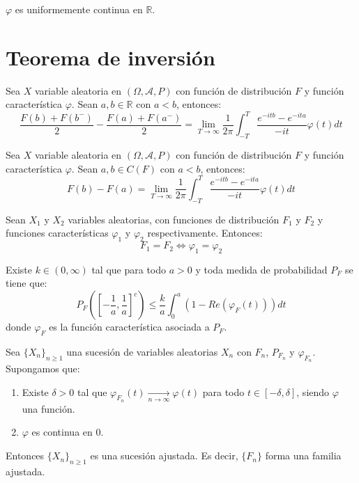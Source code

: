 \begin{theorem}
    $\varphi$ es uniformemente continua en $\mathbb{R}$.
\end{theorem}

\section{Teorema de inversión}
\begin{theorem}
    Sea $X$ variable aleatoria en $(\Omega, \mathcal{A}, P)$ con función de distribución $F$ y función característica $\varphi$.
    Sean $a, b \in \mathbb{R}$ con $a < b$, entonces:
    $$\frac{F(b)+F(b^-)}{2} - \frac{F(a)+F(a^-)}{2} = \lim\limits_{T \to \infty} \frac{1}{2\pi} \int_{-T}^T \frac{e^{-itb}-e^{-ita}}{-it} \varphi(t)dt$$
\end{theorem}

\begin{corollary}
    Sea $X$ variable aleatoria en $(\Omega, \mathcal{A}, P)$ con función de distribución $F$ y función característica $\varphi$.
    Sean $a, b \in C(F)$ con $a < b$, entonces:
    $$F(b) - F(a) = \lim\limits_{T \to \infty} \frac{1}{2\pi} \int_{-T}^T \frac{e^{-itb}-e^{-ita}}{-it} \varphi(t)dt$$
\end{corollary}

\begin{theorem}[Unicidad]
    Sean $X_1$ y $X_2$ variables aleatorias, con funciones de distribución $F_1$ y $F_2$ y funciones características $\varphi_1$ y $\varphi_2$ respectivamente.
    Entonces:
    $$F_1 = F_2 \Leftrightarrow \varphi_1 = \varphi_2$$
\end{theorem}

\begin{theorem}
    Existe $k \in (0, \infty)$ tal que para todo $a > 0$ y toda medida de probabilidad $P_F$ se tiene que:
    $$P_F \left(\left[-\frac{1}{a}, \frac{1}{a}\right]^c\right) \leq \frac{k}{a} \int_0^a (1 - Re(\varphi_F(t)))dt$$
    donde $\varphi_F$ es la función característica asociada a $P_F$.
\end{theorem}

\begin{corollary}
    Sea $\{X_n\}_{n \geq 1}$ una sucesión de variables aleatorias $X_n$ con $F_n$, $P_{F_n}$ y $\varphi_{F_n}$.
    Supongamos que:
    \begin{enumerate}
        \item Existe $\delta > 0$ tal que $\varphi_{F_n}(t) \xrightarrow[n \to \infty]{} \varphi(t)$ para todo $t \in [-\delta, \delta]$, siendo $\varphi$ una función.
        \item $\varphi$ es continua en 0.
    \end{enumerate}
    Entonces $\{X_n\}_{n \geq 1}$ es una sucesión ajustada.
    Es decir, $\{F_n\}$ forma una familia ajustada.
\end{corollary}

